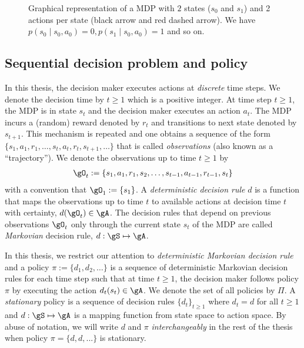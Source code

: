 \begin{figure}[ht]
    \centering
    \caption{Graphical representation of a MDP with $2$ states ($s_0$ and $s_1$) and 2 actions per state (black arrow and red dashed arrow). We have $p(s_0\mid s_0,a_0)=0, p(s_1\mid s_0,a_0)=1$ and so on.}
    \label{fig:MDP_example}
\end{figure}

\subsection{Sequential decision problem and policy}

In this thesis, the decision maker executes actions at \emph{discrete} time steps.
We denote the decision time by $t\ge1$ which is a positive integer.
At time step $t\ge1$, the MDP is in state $s_t$ and the decision maker executes an action $a_t$.
The MDP incurs a (random) reward denoted by $r_t$ and transitions to next state denoted by $s_{t+1}$.
This mechanism is repeated and one obtains a sequence of the form $\{s_1,a_1,r_1,\dots,s_t,a_t,r_t,s_{t+1},\dots\}$ that is called \emph{observations} (also known as a ``trajectory'').
We denote the observations up to time $t\ge1$ by
\begin{align*}
    \gO_t:=\{s_1,a_1,r_1,s_2,\dots,s_{t-1},a_{t-1},r_{t-1},s_t\}
\end{align*}
with a convention that $\gO_1:=\{s_1\}$.
A \emph{deterministic decision rule} $d$ is a function that maps the observations up to time $t$ to available actions at decision time $t$ with certainty, $d(\gO_t)\in\gA$.
The decision rules that depend on previous observations $\gO_t$ only through the current state $s_t$ of the MDP are called \emph{Markovian} decision rule, $d:\gS\mapsto\gA$.

In this thesis, we restrict our attention to \emph{deterministic Markovian decision rule} and a policy $\pi:=\{d_1,d_2,\dots\}$ is a sequence of deterministic Markovian decision rules for each time step such that at time $t\ge1$, the decision maker follows policy $\pi$ by executing the action $d_t(s_t)\in\gA$. 
We denote the set of all policies by $\Pi$.
A \emph{stationary} policy is a sequence of decision rules $\{d_t\}_{t\ge1}$ where $d_t=d$ for all $t\ge1$ and $d:\gS\mapsto\gA$ is a mapping function from state space to action space.
By abuse of notation, we will write $d$ and $\pi$ \emph{interchangeably} in the rest of the thesis when policy $\pi=\{d, d,...\}$ is stationary.

